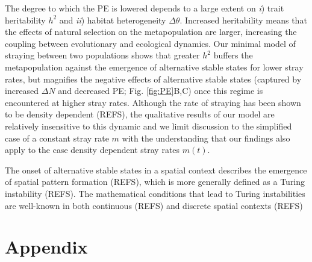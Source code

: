 \documentclass[twocolumn,preprintnumbers,amsmath,amssymb,superscriptaddress]{revtex4}
\begin{document}
The degree to which the PE is lowered depends to a large extent on \emph{i}) trait heritability $h^2$ and \emph{ii}) habitat heterogeneity $\Delta \theta$.
Increased heritability means that the effects of natural selection on the metapopulation are larger, increasing the coupling between evolutionary and ecological dynamics. 
Our minimal model of straying between two populations shows that greater $h^2$ buffers the metapopulation against the emergence of alternative stable states for lower stray rates, but magnifies the negative effects of alternative stable states (captured by increased $\Delta N$ and decreased PE; Fig. \ref{fig:PE}B,C) once this regime is encountered at higher stray rates.
Although the rate of straying has been shown to be density dependent (REFS), the qualitative results of our model are relatively insensitive to this dynamic and we limit discussion to the simplified case of a constant stray rate $m$ with the understanding that our findings also apply to the case density dependent stray rates $m(t)$.

The onset of alternative stable states in a spatial context describes the emergence of spatial pattern formation (REFS), which is more generally defined as a Turing instability (REFS).
The mathematical conditions that lead to Turing instabilities are well-known in both continuous (REFS) and discrete spatial contexts (REFS)




\clearpage
\setcounter{figure}{0}
\section*{Appendix}
\end{document}
